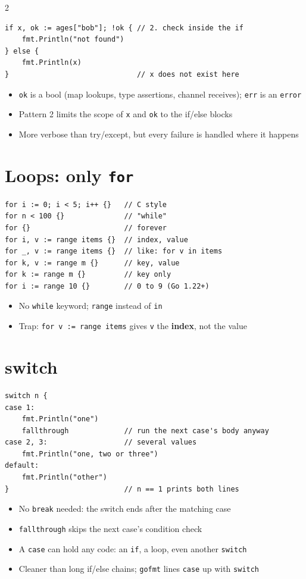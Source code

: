 \documentclass[9pt]{extarticle}
\newcommand{\kw}[1]{\textcolor{accent}{\texttt{#1}}}
\begin{document}
\begin{multicols*}{2}
\begin{lstlisting}
if x, ok := ages["bob"]; !ok { // 2. check inside the if
    fmt.Println("not found")
} else {
    fmt.Println(x)
}                              // x does not exist here
\end{lstlisting}
\begin{itemize}
  \item \kw{ok} is a bool (map lookups, type assertions, channel receives); \kw{err} is an \kw{error}
  \item Pattern 2 limits the scope of \kw{x} and \kw{ok} to the if/else blocks
  \item More verbose than try/except, but every failure is handled where it happens
\end{itemize}

\section{Loops: only \texttt{for}}
\begin{lstlisting}
for i := 0; i < 5; i++ {}   // C style
for n < 100 {}              // "while"
for {}                      // forever
for i, v := range items {}  // index, value
for _, v := range items {}  // like: for v in items
for k, v := range m {}      // key, value
for k := range m {}         // key only
for i := range 10 {}        // 0 to 9 (Go 1.22+)
\end{lstlisting}
\begin{itemize}
  \item No \kw{while} keyword; \kw{range} instead of \kw{in}
  \item Trap: \kw{for v := range items} gives \kw{v} the \textbf{index}, not the value
\end{itemize}

\section{switch}
\begin{lstlisting}
switch n {
case 1:
    fmt.Println("one")
    fallthrough             // run the next case's body anyway
case 2, 3:                  // several values
    fmt.Println("one, two or three")
default:
    fmt.Println("other")
}                           // n == 1 prints both lines
\end{lstlisting}
\begin{itemize}
  \item No \kw{break} needed: the switch ends after the matching case
  \item \kw{fallthrough} skips the next case's condition check
  \item A \kw{case} can hold any code: an \kw{if}, a loop, even another \kw{switch}
  \item Cleaner than long if/else chains; \kw{gofmt} lines \kw{case} up with \kw{switch}
\end{itemize}


\end{multicols*}
\end{document}
